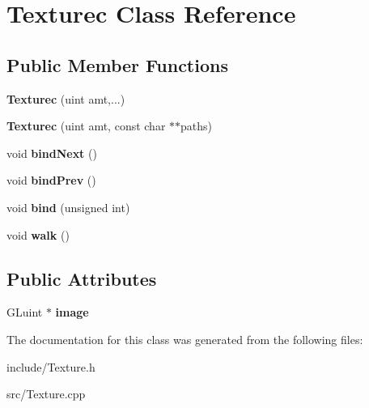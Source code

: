 \hypertarget{classTexturec}{}\section{Texturec Class Reference}
\label{classTexturec}
\subsection*{Public Member Functions}
\begin{DoxyCompactItemize}
\item 
\hypertarget{classTexturec_a9c85c5ad8c49b20e345af412ec9a8cf7}{}{\bfseries Texturec} (uint amt,...)\label{classTexturec_a9c85c5ad8c49b20e345af412ec9a8cf7}

\item 
\hypertarget{classTexturec_a13dfae47f9fa2e09f79530b07a751fcd}{}{\bfseries Texturec} (uint amt, const char $\ast$$\ast$paths)\label{classTexturec_a13dfae47f9fa2e09f79530b07a751fcd}

\item 
\hypertarget{classTexturec_a81be789f196a84a31083b3b2125d76fc}{}void {\bfseries bind\+Next} ()\label{classTexturec_a81be789f196a84a31083b3b2125d76fc}

\item 
\hypertarget{classTexturec_abe4c65be6bedab6909ee6bd9cd349654}{}void {\bfseries bind\+Prev} ()\label{classTexturec_abe4c65be6bedab6909ee6bd9cd349654}

\item 
\hypertarget{classTexturec_a71609907927fdf94bd217991b6e87988}{}void {\bfseries bind} (unsigned int)\label{classTexturec_a71609907927fdf94bd217991b6e87988}

\item 
\hypertarget{classTexturec_af1af4af64edca50836478f27501c2e6b}{}void {\bfseries walk} ()\label{classTexturec_af1af4af64edca50836478f27501c2e6b}

\end{DoxyCompactItemize}
\subsection*{Public Attributes}
\begin{DoxyCompactItemize}
\item 
\hypertarget{classTexturec_affe3209886e041c0deac1f54eb0bb6ce}{}G\+Luint $\ast$ {\bfseries image}\label{classTexturec_affe3209886e041c0deac1f54eb0bb6ce}

\end{DoxyCompactItemize}


The documentation for this class was generated from the following files\+:\begin{DoxyCompactItemize}
\item 
include/Texture.\+h\item 
src/Texture.\+cpp\end{DoxyCompactItemize}
